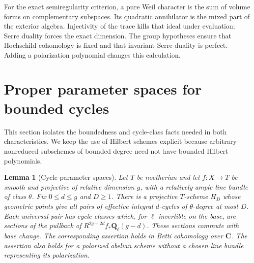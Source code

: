 \documentclass[11pt]{article}
\newtheorem{lemma}[theorem]{Lemma}
\theoremstyle{definition}
\theoremstyle{remark}
\newcommand{\Q}{\mathbf Q}
\newcommand{\C}{\mathbf C}
\begin{document}
For the exact semiregularity criterion, a pure Weil character is the
sum of volume forms on complementary subspaces. Its quadratic
annihilator is the mixed part of the exterior algebra. Injectivity of
the trace kills that ideal under evaluation; Serre duality forces the
exact dimension. The group hypotheses ensure that Hochschild
cohomology is fixed and that invariant Serre duality is perfect.
Adding a polarization polynomial changes this calculation.


\section{Proper parameter spaces for bounded cycles}
\label{sec:parameters}

This section isolates the boundedness and cycle-class facts needed in both characteristics. We keep the use of Hilbert schemes explicit because arbitrary nonreduced subschemes of bounded degree need not have bounded Hilbert polynomials.

\begin{lemma}[Cycle parameter spaces]\label{lem:parameters}
Let $T$ be noetherian and let $f:X\to T$ be smooth and projective of relative dimension $g$, with a relatively ample line bundle of class $\theta$. Fix $0\leq d\leq g$ and $D\geq1$. There is a projective $T$-scheme $H_D$ whose geometric points give all pairs of effective integral $d$-cycles of $\theta$-degree at most $D$. Each universal pair has cycle classes which, for $\ell$ invertible on the base, are sections of the pullback of $R^{2g-2d}f_*\Q_\ell(g-d)$. These sections commute with base change. The corresponding assertion holds in Betti cohomology over $\C$. The assertion also holds for a polarized abelian scheme without a chosen line bundle representing its polarization.
\end{lemma}
\end{document}
